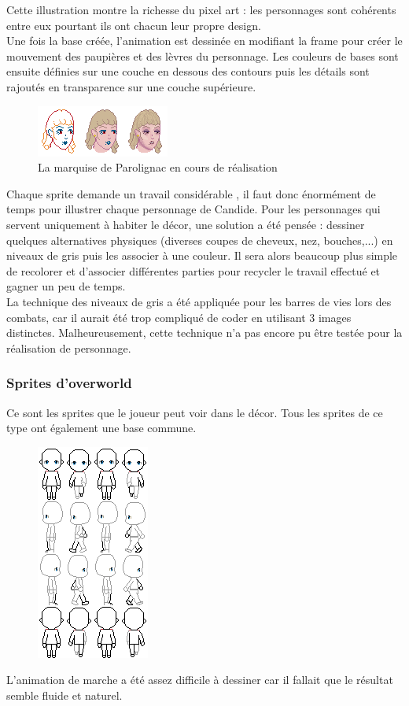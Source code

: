 \documentclass[11pt]{article}
\begin{document}
Cette illustration montre la richesse du pixel art : les personnages sont cohérents entre eux pourtant ils ont chacun leur propre design.\\

Une fois la base créée, l'animation est dessinée en modifiant la frame pour créer le mouvement des paupières et des lèvres du personnage. Les couleurs de bases sont ensuite définies sur une couche en dessous des contours puis les détails sont rajoutés en transparence sur une couche supérieure. 
\begin{figure}[H]
\includegraphics[scale=1.5]{exempleTM}
\centering
\caption{La marquise de Parolignac en cours de réalisation}
\end{figure}

Chaque sprite demande un travail considérable , il faut donc énormément de temps pour illustrer chaque personnage de Candide. Pour les personnages qui servent uniquement à habiter le décor, une solution a été pensée : dessiner quelques alternatives physiques (diverses coupes de cheveux, nez, bouches,...) en niveaux de gris puis les associer à une couleur. Il sera alors beaucoup plus simple de recolorer et d'associer différentes parties pour recycler le travail effectué et gagner un peu de temps.\\
La technique des niveaux de gris a été appliquée pour les barres de vies lors des combats, car il aurait été trop compliqué de coder en utilisant 3 images distinctes. Malheureusement, cette technique n'a pas encore pu être testée pour la réalisation de personnage.
\subsubsection{Sprites d'overworld}
Ce sont les sprites que le joueur peut voir dans le décor. Tous les sprites de ce type ont également une base commune.
\begin{figure}[H]
\includegraphics[scale=1]{animationBase}
\centering
\end{figure}
L'animation de marche a été assez difficile à dessiner car il fallait que le résultat semble fluide et naturel.\\
\end{document}
